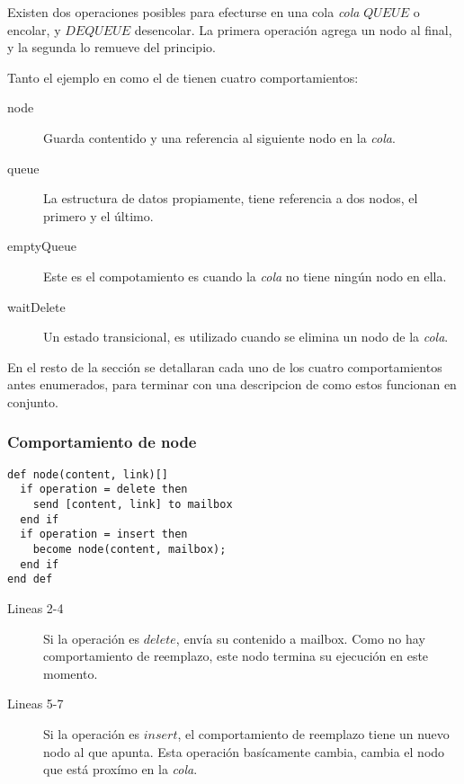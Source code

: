 Existen dos operaciones posibles para efecturse en una cola \textit{cola} $QUEUE$ o encolar, y $DEQUEUE$ desencolar. La primera operación agrega un nodo al final, y la segunda lo remueve del principio.

Tanto el ejemplo en \SAL como el de \CSPm tienen cuatro comportamientos:

\begin{description}
 \item [node] Guarda contentido y una referencia al siguiente nodo en la \textit{cola}.
 \item [queue] La estructura de datos propiamente, tiene referencia a dos nodos, el primero y el último.
 \item [emptyQueue] Este es el compotamiento es cuando la \textit{cola} no tiene ningún nodo en ella.
 \item [waitDelete] Un estado transicional, es utilizado cuando se elimina un nodo de la \textit{cola}.
\end{description}

En el resto de la sección se detallaran cada uno de los cuatro comportamientos antes enumerados, para terminar con una descripcion de como estos funcionan en conjunto.

\subsubsection*{Comportamiento de node}

\begin{lstlisting}[language=sal, style=simple]
def node(content, link)[]
  if operation = delete then
    send [content, link] to mailbox
  end if
  if operation = insert then
    become node(content, mailbox);
  end if
end def
\end{lstlisting}

\begin{description}
 \item [Lineas 2-4] Si la operación es $delete$, envía su contenido a mailbox. Como no hay comportamiento de reemplazo, este nodo termina su ejecución en este momento.
 \item [Lineas 5-7] Si la operación es $insert$, el comportamiento de reemplazo tiene un nuevo nodo al que apunta. Esta operación basícamente cambia, cambia el nodo que está proxímo en la \textit{cola}.
\end{description}

